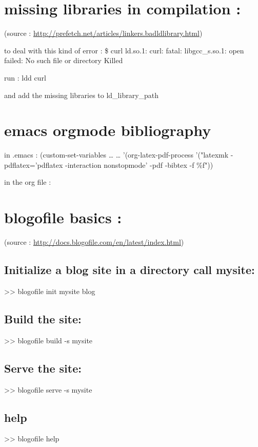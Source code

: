 \documentclass[11pt]{article}
\begin{document}
\section{missing libraries in compilation :}
\label{sec-67}
(source : \url{http://prefetch.net/articles/linkers.badldlibrary.html})

to deal with this kind of error : 
\$ curl
ld.so.1: curl: fatal: libgcc\_s.so.1: open failed: No such file or directory
Killed

run : ldd curl

and add the missing libraries to ld\_library\_path
\section{emacs orgmode bibliography}
\label{sec-68}

in .emacs :
(custom-set-variables
\ldots{}
\ldots{}
 '(org-latex-pdf-process
  '("latexmk -pdflatex='pdflatex -interaction nonstopmode' -pdf -bibtex -f \%f"))

in the org file : 

\section{blogofile basics :}
\label{sec-69}
(source : \url{http://docs.blogofile.com/en/latest/index.html})
\subsection{Initialize a blog site in a directory call mysite:}
\label{sec-69-1}
>> blogofile init mysite blog
\subsection{Build the site:}
\label{sec-69-2}
>> blogofile build -s mysite
\subsection{Serve the site:}
\label{sec-69-3}
>> blogofile serve -s mysite
\subsection{help}
\label{sec-69-4}
>> blogofile help
\end{document}
